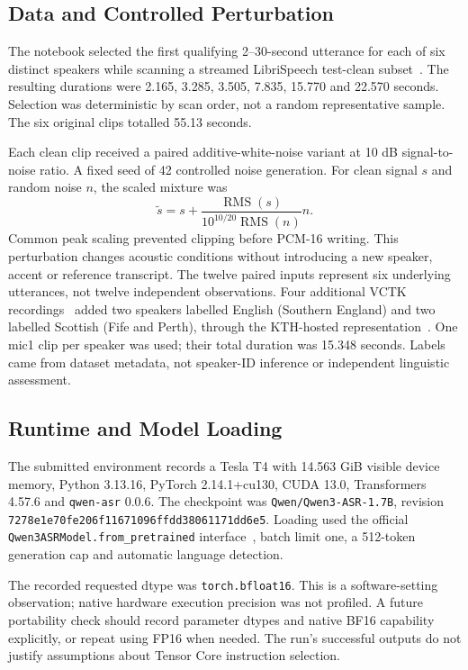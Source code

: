 \documentclass[conference]{IEEEtran}
\begin{document}
\subsection{Data and Controlled Perturbation}
The notebook selected the first qualifying 2--30-second utterance for each of six distinct speakers while scanning a streamed LibriSpeech test-clean subset~\cite{librispeech}. The resulting durations were 2.165, 3.285, 3.505, 7.835, 15.770 and 22.570 seconds. Selection was deterministic by scan order, not a random representative sample. The six original clips totalled 55.13 seconds.

Each clean clip received a paired additive-white-noise variant at 10 dB signal-to-noise ratio. A fixed seed of 42 controlled noise generation. For clean signal $s$ and random noise $n$, the scaled mixture was
\begin{equation}
\tilde{s}=s+\frac{\operatorname{RMS}(s)}{10^{10/20}\operatorname{RMS}(n)}n.
\end{equation}
Common peak scaling prevented clipping before PCM-16 writing. This perturbation changes acoustic conditions without introducing a new speaker, accent or reference transcript. The twelve paired inputs represent six underlying utterances, not twelve independent observations. Four additional VCTK recordings~\cite{vctk} added two speakers labelled English (Southern England) and two labelled Scottish (Fife and Perth), through the KTH-hosted representation~\cite{vctkrep}. One mic1 clip per speaker was used; their total duration was 15.348 seconds. Labels came from dataset metadata, not speaker-ID inference or independent linguistic assessment.

\subsection{Runtime and Model Loading}
The submitted environment records a Tesla T4 with 14.563 GiB visible device memory, Python 3.13.16, PyTorch 2.14.1+cu130, CUDA 13.0, Transformers 4.57.6 and \texttt{qwen-asr} 0.0.6. The checkpoint was \texttt{Qwen/Qwen3-ASR-1.7B}, revision \texttt{7278e1e70fe206f11671096ffdd38061171dd6e5}. Loading used the official \texttt{Qwen3ASRModel.from\_pretrained} interface~\cite{toolkit}, batch limit one, a 512-token generation cap and automatic language detection.

The recorded requested dtype was \texttt{torch.bfloat16}. This is a software-setting observation; native hardware execution precision was not profiled. A future portability check should record parameter dtypes and native BF16 capability explicitly, or repeat using FP16 when needed. The run's successful outputs do not justify assumptions about Tensor Core instruction selection.
\end{document}
